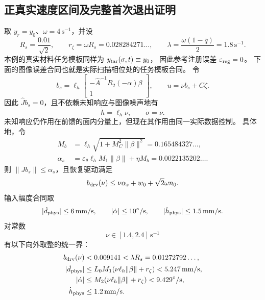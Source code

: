 \documentclass[11pt,a4paper]{article}
\numberwithin{equation}{section}
\theoremstyle{definition}
\begin{document}
\subsection{正真实速度区间及完整首次退出证明}
取 $y_r=y_0$、$\omega=4\,\mathrm{s}^{-1}$，并设
\begin{equation}
 R_s=\frac{0.01}{\sqrt2},\qquad
 r_\zeta=\omega R_s=0.028284271\ldots,\qquad
 \lambda=\frac{\omega(1-\bar q)}2=1.8\,\mathrm{s}^{-1}.
\end{equation}
本例的真实材料任务模板同样为 $y_{\rm tar}(\sigma,t)\equiv y_0$，
因此参考注册误差 $\varepsilon_{\rm reg}=0$。
下面的图像误差合同也就是实际扫描相位处的任务模板合同。
令
\begin{equation}
 b_s=\ell_h\begin{bmatrix}
          -\widehat A^{-1}R_2(-\alpha)\beta\\1
        \end{bmatrix},\qquad
 u=\nu b_s+C\zeta.
 \label{v44:eq:new-calibrated-feedforward}
\end{equation}
因此 $\widehat Jb_s=0$，且不依赖未知响应与图像噪声地有
\begin{equation}
 \dot h=\ell_h\nu,\qquad \dot\sigma=\nu.
 \label{v44:eq:new-exact-actual-progress}
\end{equation}
未知响应仍作用在前馈的面内分量上，但现在其作用由同一实际数据控制。
具体地，令
\begin{align}
 M_b&=\ell_h\sqrt{1+M_C^2\|\beta\|^2}
          =0.165484327\ldots,\\
 \alpha_s&=\varepsilon_\theta\ell_hM_1\|\beta\|+\eta M_b
          =0.0022135202\ldots .
 \label{v44:eq:new-feedforward-data-bound}
\end{align}
则 $\|Jb_s\|\le\alpha_s$，且恢复驱动满足
\begin{equation}
 b_{\rm drv}(\nu)\le\nu\alpha_s+w_0+\sqrt2\omega n_0.
\end{equation}
输入幅度合同取
\begin{equation}
 |\dot d_{\rm phys}|\le6\,\mathrm{mm/s},\qquad
 |\dot\alpha|\le10^\circ/\mathrm{s},\qquad
 |\dot h_{\rm phys}|\le1.5\,\mathrm{mm/s}.
\end{equation}
对常数
\begin{equation}
 \boxed{\nu\in[1.4,2.4]\,\mathrm{s}^{-1}}
 \label{v44:eq:new-speed-interval}
\end{equation}
有以下向外取整的统一界：
\begin{align}
 b_{\rm drv}(\nu)&<0.009141<\lambda R_s=0.01272792\ldots,\\
 |\dot d_{\rm phys}|&\le L_0M_1(\nu\ell_h\|\beta\|+r_\zeta)<5.247\,\mathrm{mm/s},\\
 |\dot\alpha|&\le M_2(\nu\ell_h\|\beta\|+r_\zeta)<9.429^\circ/\mathrm{s},\\
 \dot h_{\rm phys}&\le1.2\,\mathrm{mm/s}.
 \label{v44:eq:new-speed-margins}
\end{align}
\end{document}
